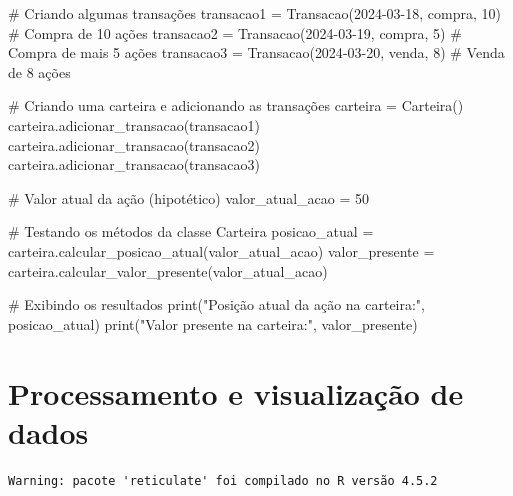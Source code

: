 \documentclass[
  portuguese,
  letterpaper,
  DIV=11,
  numbers=noendperiod]{scrreprt}
\newenvironment{Shaded}{\begin{snugshade}}{\end{snugshade}}
\newcommand{\BuiltInTok}[1]{\textcolor[rgb]{0.00,0.23,0.31}{#1}}
\newcommand{\CommentTok}[1]{\textcolor[rgb]{0.37,0.37,0.37}{#1}}
\newcommand{\DecValTok}[1]{\textcolor[rgb]{0.68,0.00,0.00}{#1}}
\newcommand{\NormalTok}[1]{\textcolor[rgb]{0.00,0.23,0.31}{#1}}
\newcommand{\OperatorTok}[1]{\textcolor[rgb]{0.37,0.37,0.37}{#1}}
\newcommand{\StringTok}[1]{\textcolor[rgb]{0.13,0.47,0.30}{#1}}
\theoremstyle{definition}
\theoremstyle{remark}
\begin{document}
\begin{Shaded}
\begin{Highlighting}[]
\CommentTok{\# Criando algumas transações}
\NormalTok{transacao1 }\OperatorTok{=}\NormalTok{ Transacao(}\StringTok{\textquotesingle{}2024{-}03{-}18\textquotesingle{}}\NormalTok{, }\StringTok{\textquotesingle{}compra\textquotesingle{}}\NormalTok{, }\DecValTok{10}\NormalTok{)  }\CommentTok{\# Compra de 10 ações}
\NormalTok{transacao2 }\OperatorTok{=}\NormalTok{ Transacao(}\StringTok{\textquotesingle{}2024{-}03{-}19\textquotesingle{}}\NormalTok{, }\StringTok{\textquotesingle{}compra\textquotesingle{}}\NormalTok{, }\DecValTok{5}\NormalTok{)   }\CommentTok{\# Compra de mais 5 ações}
\NormalTok{transacao3 }\OperatorTok{=}\NormalTok{ Transacao(}\StringTok{\textquotesingle{}2024{-}03{-}20\textquotesingle{}}\NormalTok{, }\StringTok{\textquotesingle{}venda\textquotesingle{}}\NormalTok{, }\DecValTok{8}\NormalTok{)    }\CommentTok{\# Venda de 8 ações}

\CommentTok{\# Criando uma carteira e adicionando as transações}
\NormalTok{carteira }\OperatorTok{=}\NormalTok{ Carteira()}
\NormalTok{carteira.adicionar\_transacao(transacao1)}
\NormalTok{carteira.adicionar\_transacao(transacao2)}
\NormalTok{carteira.adicionar\_transacao(transacao3)}

\CommentTok{\# Valor atual da ação (hipotético)}
\NormalTok{valor\_atual\_acao }\OperatorTok{=} \DecValTok{50}

\CommentTok{\# Testando os métodos da classe Carteira}
\NormalTok{posicao\_atual }\OperatorTok{=}\NormalTok{ carteira.calcular\_posicao\_atual(valor\_atual\_acao)}
\NormalTok{valor\_presente }\OperatorTok{=}\NormalTok{ carteira.calcular\_valor\_presente(valor\_atual\_acao)}

\CommentTok{\# Exibindo os resultados}
\BuiltInTok{print}\NormalTok{(}\StringTok{"Posição atual da ação na carteira:"}\NormalTok{, posicao\_atual)}
\BuiltInTok{print}\NormalTok{(}\StringTok{"Valor presente na carteira:"}\NormalTok{, valor\_presente)}
\end{Highlighting}
\end{Shaded}

\chapter{Processamento e visualização de
dados}\label{processamento-e-visualizauxe7uxe3o-de-dados}

\begin{verbatim}
Warning: pacote 'reticulate' foi compilado no R versão 4.5.2
\end{verbatim}
\end{document}

